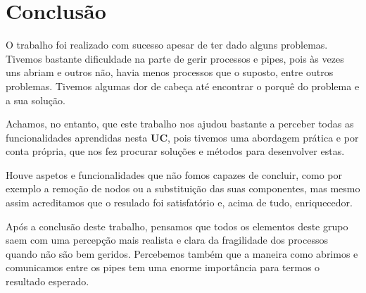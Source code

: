 \documentclass{article}
\begin{document}
\section{Conclusão}
\par O trabalho foi realizado com sucesso apesar de ter dado alguns problemas. Tivemos bastante dificuldade na parte de gerir processos e pipes, pois às vezes uns abriam e outros não, havia menos processos que o suposto, entre outros problemas. Tivemos algumas dor de cabeça até encontrar o porquê do problema e a sua solução.
\par Achamos, no entanto, que este trabalho nos ajudou bastante a perceber todas as funcionalidades aprendidas nesta \textbf{UC}, pois tivemos uma abordagem prática e por conta própria, que nos fez procurar soluções e métodos para desenvolver estas.
\par Houve aspetos e funcionalidades que não fomos capazes de concluir, como por exemplo a remoção de nodos ou a substituição das suas componentes, mas mesmo assim acreditamos que o resulado foi satisfatório e, acima de tudo, enriquecedor.
\par Após a conclusão deste trabalho, pensamos que todos os elementos deste grupo saem com uma percepção mais realista e clara da fragilidade dos processos quando não são bem geridos. Percebemos também que a maneira como abrimos e comunicamos entre os pipes tem uma enorme importância para termos o resultado esperado.
\end{document}
